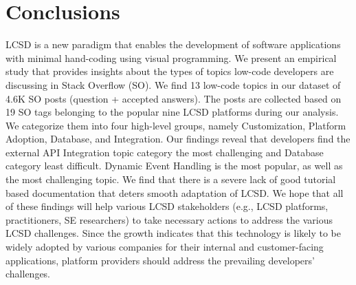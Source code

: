 \section{Conclusions} \label{sec:conclusion}
LCSD is a new paradigm that enables the development of
software applications with minimal hand-coding using visual programming. We present an empirical study that provides insights about the types of topics low-code developers are discussing in Stack Overflow (SO). We find 13 low-code topics in our dataset of 4.6K SO posts (question + accepted answers). The posts are collected based on 19 SO tags belonging to the popular nine  LCSD platforms during our analysis. We categorize them into four high-level groups, namely Customization, Platform Adoption, Database, and Integration. Our findings reveal that developers find the external API Integration topic category the most challenging and Database category least difficult. Dynamic Event Handling is the most popular, as well as the most challenging topic. We find that there is a severe lack of good tutorial based documentation that deters smooth adaptation of LCSD. We hope that all of these findings will help various  LCSD stakeholders (e.g.,  LCSD platforms, practitioners, SE researchers) to take necessary actions to address the various  LCSD challenges. Since the growth indicates that this technology is likely to be widely adopted by various companies for their internal and customer-facing applications, platform providers should address the prevailing developers' challenges.



